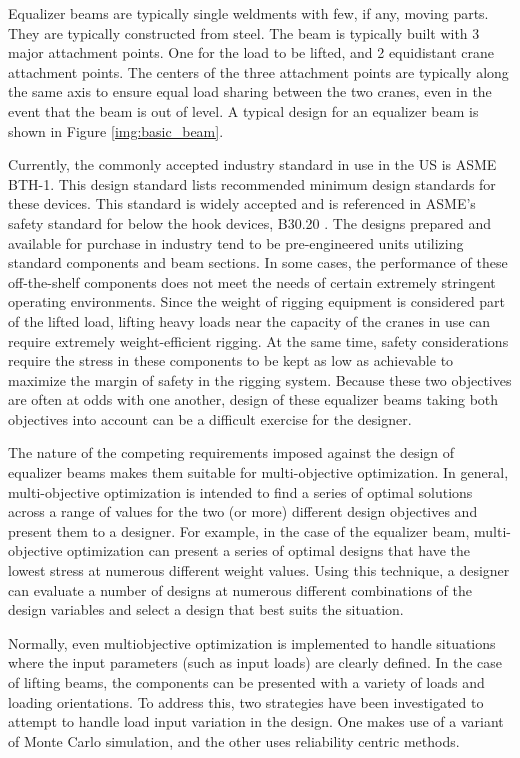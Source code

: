 Equalizer beams are typically single weldments with few, if any, moving parts. They are typically constructed from steel. The beam is typically built with 3 major attachment points. One for the load to be lifted, and 2 equidistant crane attachment points. The centers of the three attachment points are typically along the same axis to ensure equal load sharing between the two cranes, even in the event that the beam is out of level. A typical design for an equalizer beam is shown in Figure \ref{img:basic_beam}. 

Currently, the commonly accepted industry standard in use in the US is ASME BTH-1\cite{asme-bth-1}. This design standard lists recommended minimum design standards for these devices. This standard is widely accepted and is referenced in ASME's safety standard for below the hook devices, B30.20 \cite{asme-b30-20}. The designs prepared and available for purchase in industry tend to be pre-engineered units utilizing standard components and beam sections. In some cases, the performance of these off-the-shelf components does not meet the needs of certain extremely stringent operating environments. Since the weight of rigging equipment is considered part of the lifted load, lifting heavy loads near the capacity of the cranes in use can require extremely weight-efficient rigging. At the same time, safety considerations require the stress in these components to be kept as low as achievable to maximize the margin of safety in the rigging system. Because these two objectives are often at odds with one another, design of these equalizer beams taking both objectives into account can be a difficult exercise for the designer. 

The nature of the competing requirements imposed against the design of equalizer beams makes them suitable for multi-objective optimization. In general, multi-objective optimization is intended to find a series of optimal solutions across a range of values for the two (or more) different design objectives and present them to a designer. For example, in the case of the equalizer beam, multi-objective optimization can present a series of optimal designs that have the lowest stress at numerous different weight values.  Using this technique, a designer can evaluate a number of designs at numerous different combinations of the design variables and select a design that best suits the situation. 

Normally, even multiobjective optimization is implemented to handle situations where the input parameters (such as input loads) are clearly defined. In the case of lifting beams, the components can be presented with a variety of loads and loading orientations. To address this, two strategies have been investigated to attempt to handle load input variation in the design. One makes use of a variant of Monte Carlo simulation, and the other uses reliability centric methods. 
